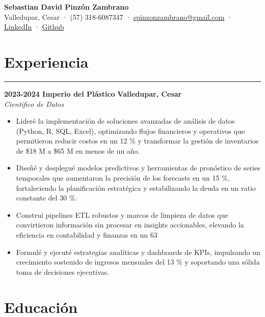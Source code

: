 \documentclass[9pt,a4paper]{article}
\newcommand{\cvevent}[4]{%
  {\noindent \textbf{#1 #2} \hfill \textbf{#3}\\%
   \textit{#4}\\[0pt]}%
}
\begin{document}
\begin{center}
    \textbf{\LARGE Sebastian David Pinzón Zambrano} \\
    Valledupar, Cesar · (57) 318-6087347 · 
    \href{mailto:spinzonzambrano@gmail.com}{spinzonzambrano@gmail.com} ·
    \href{https://www.linkedin.com/in/sebastiandpinzon/?locale=es_ES}{LinkedIn} · 
    \href{https://github.com/Ares-Infenus}{Github}
\end{center}
\vspace{-\baselineskip}
\vspace{-\baselineskip}
\section*{Experiencia}
\vspace{-\baselineskip}

\vspace{-\baselineskip}

\noindent\rule{\linewidth}{0.5pt}

\cvevent{2023-2024}{Imperio del Plástico}{Valledupar, Cesar}{Cientifico de Datos}
\vspace{-\baselineskip}
\begin{itemize}[noitemsep, topsep=0pt]
    \item Lideré la implementación de soluciones avanzadas de análisis de datos (Python, R, SQL, Excel), optimizando flujos financieros y operativos que permitieron reducir costos en un 12 \% y transformar la gestión de inventarios de \$18 M a \$65 M en menos de un año.
    \item Diseñé y desplegué modelos predictivos y herramientas de pronóstico de series temporales que aumentaron la precisión de los forecasts en un 15 \%, fortaleciendo la planificación estratégica y estabilizando la deuda en un ratio constante del 30 \%.
    \item Construí pipelines ETL robustos y marcos de limpieza de datos que convirtieron información sin procesar en insights accionables, elevando la eficiencia en contabilidad y finanzas en un 63 %
    \item Formulé y ejecuté estrategias analíticas y dashboards de KPIs, impulsando un crecimiento sostenido de ingresos mensuales del 13 \% y soportando una sólida toma de decisiones ejecutivas.
\end{itemize}
\vspace{-\baselineskip}
\vspace{-\baselineskip}

\section*{Educación}
\vspace{-\baselineskip}
\vspace{-\baselineskip}
\end{document}
